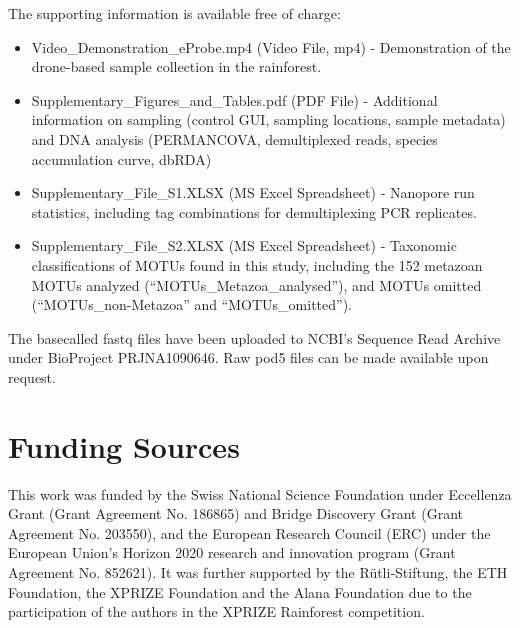 \begin{suppinfo}

The supporting information is available free of charge:
\begin{itemize}
  \item Video\_Demonstration\_eProbe.mp4 (Video File, mp4) - Demonstration of the drone-based sample collection in the rainforest.
  \item Supplementary\_Figures\_and\_Tables.pdf (PDF File) - Additional information on sampling (control GUI, sampling locations, sample metadata) and DNA analysis (PERMANCOVA, demultiplexed reads, species accumulation curve, dbRDA)
  \item Supplementary\_File\_S1.XLSX (MS Excel Spreadsheet) - Nanopore run statistics, including tag combinations for demultiplexing PCR replicates.
  \item Supplementary\_File\_S2.XLSX (MS Excel Spreadsheet) - Taxonomic classifications of MOTUs found in this study, including the 152 metazoan MOTUs analyzed (“MOTUs\_Metazoa\_analysed”), and MOTUs omitted (“MOTUs\_non-Metazoa” and “MOTUs\_omitted”). 
\end{itemize}

The basecalled fastq files have been uploaded to NCBI’s Sequence Read Archive under BioProject PRJNA1090646. Raw pod5 files can be made available upon request. 

\end{suppinfo}


\section*{Funding Sources}

This work was funded by the Swiss National Science Foundation under Eccellenza Grant (Grant Agreement No. 186865) and Bridge Discovery Grant (Grant Agreement No. 203550), and the European Research Council (ERC) under the European Union's Horizon 2020 research and innovation program (Grant Agreement No. 852621). It was further supported by the Rütli-Stiftung, the ETH Foundation, the XPRIZE Foundation and the Alana Foundation due to the participation of the authors in the XPRIZE Rainforest competition.

